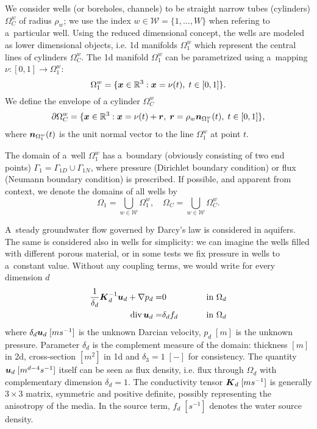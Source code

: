 We consider wells (or boreholes, channels) to be straight narrow tubes (cylinders) $\Omega^w_C$ of radius $\rho_w$;
we use the index $w\in\mathcal{W}=\{1,\ldots,W\}$ when refering to a~particular well.
Using the reduced dimensional concept, the wells are modeled as lower dimensional objects,
i.e. 1d manifolds $\Omega^w_1$ which represent the central lines of cylinders $\Omega^w_C$.
The 1d manifold $\Omega^w_1$ can be parametrized using a~mapping $\nu: [0,1] \rightarrow \Omega^w_1$:
\begin{equation} \label{eqn:1d_parametrization}
    \Omega^w_1 = \{\vc x\in\R^3: \vc x = \nu(t),\; t\in[0,1] \}. %
\end{equation}
We define the envelope of a cylinder $\Omega^w_C$
\[
    \partial\Omega^w_C = \{\mathbf{\boldsymbol{x}}\in\mathbb{R}^3: \mathbf{\boldsymbol{x}} = \nu(t) + \mathbf{\boldsymbol{r}},\; \mathbf{\boldsymbol{r}}=\rho_w\mathbf{\boldsymbol{n}}_{\Omega^w_1}(t),\; t\in[0,1] \},
\]
where $\mathbf{\boldsymbol{n}}_{\Omega^w_1}(t)$ is the unit normal vector to the line $\Omega^w_1$ at point $t$.

The domain of a~well $\Omega^w_1$ has a~boundary (obviously consisting of two end points)
$\Gamma_1 = \Gamma_{1D} \cup \Gamma_{1N}$, where pressure (Dirichlet boundary condition)
or flux (Neumann boundary condition) is prescribed.
If possible, and apparent from context, we denote the domains of all wells by
\[
    \Omega_1 = \bigcup_{w\in\mathcal{W}} \Omega^w_1, \quad \Omega_C = \bigcup_{w\in\mathcal{W}} \Omega^w_C.
\]

A~steady groundwater flow governed by Darcy's law is considered in aquifers.
The same is considered also in wells for simplicity:
we can imagine the wells filled with different porous material, or in some tests we fix pressure in wells to a~constant value.
Without any coupling terms, we would write for every dimension $d$
\begin{eqnarray*}
     \frac{1}{\delta_d} \mathbf{\boldsymbol{K}}_d^{-1} \mathbf{\boldsymbol{u}}_d + \nabla p_d =& 0  &\qquad \textrm{ in }\Omega_d\\
      {\rm div}\,\mathbf{\boldsymbol{u}}_d  =& \delta_d f_d  &\qquad \textrm{ in }\Omega_d
\end{eqnarray*}
where $\delta_d\mathbf{\boldsymbol{u}}_d\; [ms^{-1}]$ is the unknown Darcian velocity, $p_d \; [m]$ is the unknown pressure.
Parameter $\delta_d$ is the complement measure of the domain: thickness $[m]$ in 2d,
cross-section $[m^2]$ in 1d and $\delta_3=1\; [-]$ for consistency.
The quantity $\mathbf{\boldsymbol{u}}_d\; [m^{d-4}s^{-1}]$ itself can be seen as flux density, i.e. flux through $\Omega_d$
with complementary dimension $\delta_d=1$.
The conductivity tensor $\mathbf{\boldsymbol{K}}_d\; [ms^{-1}]$ is generally $3\times 3$ matrix,
symmetric and positive definite, possibly representing the anisotropy of the media.
In the source term, $f_d\;[s^{-1}]$ denotes the water source density.

